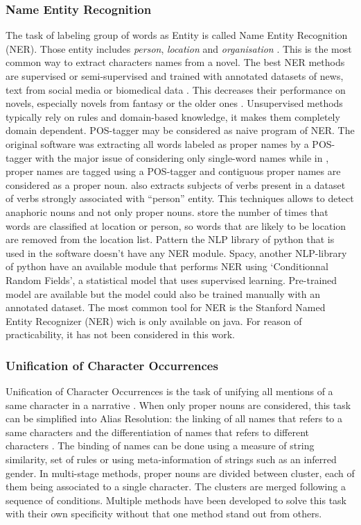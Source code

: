 \documentclass[a4paper, 12pt]{report}
\begin{document}
\subsubsection{Name Entity Recognition}
The task of labeling group of words as Entity is called Name Entity Recognition (NER). Those entity includes \textit{person}, \textit{location} and \textit{organisation} \citep{libraries}. This is the most common way to extract characters names from a novel.
The best NER methods are supervised or semi-supervised and trained with annotated datasets of news, text from social media or biomedical data \citep{NER_survey_recent}. This decreases their performance on novels, especially novels from fantasy or the older ones \citep{NER}.  Unsupervised methods typically rely on rules and domain-based knowledge, it makes them completely domain dependent.  POS-tagger may be considered as naive program of NER. The original software \citep{original} was extracting all words labeled as proper names by a POS-tagger with the major issue of considering only single-word names while in \cite{quoted}, proper names are tagged using a POS-tagger and contiguous proper names are considered as a proper noun. \cite{character_meta} also extracts subjects of verbs present in a dataset of verbs strongly associated with ``person'' entity. This techniques allows to detect anaphoric nouns and not only proper nouns. \cite{ structure_clustering} store the number of times that words are classified at location or person, so words that are likely to be location are removed from the location list.
Pattern the NLP  library of python that is used in the software doesn't have any NER module. Spacy, another NLP-library of python have an available module that performs NER using `Conditionnal Random Fields', a statistical model that uses supervised learning. Pre-trained model are available but the model could also be trained manually with an annotated dataset.  The most common tool for NER is the Stanford Named Entity Recognizer (NER) wich is only available on java. For reason of practicability, it has not been considered in this work.


\subsubsection{Unification of Character Occurrences}
Unification of Character Occurrences is the task of unifying all mentions of a same character in a narrative \citep{fiction}. When only proper nouns are considered, this task can be simplified into Alias Resolution: the linking of all names that refers to a same characters and the differentiation of names that refers to different characters \citep{book_social}.
The binding of names can be done using a measure of string similarity, set of rules or using meta-information of strings such as an inferred gender. In multi-stage methods, proper nouns are divided between cluster, each of them being associated to a single character. The clusters are merged following a sequence of conditions. Multiple methods have been developed to solve this task with their own specificity without that one method stand out from others.\\
\end{document}
